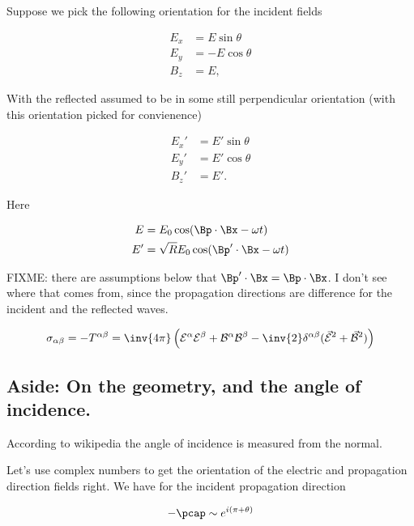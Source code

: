 Suppose we pick the following orientation for the incident fields

\begin{align}\label{eqn:relativisticElectrodynamicsT9:70}
E_x &= E \sin\theta \\
E_y &= -E \cos\theta \\
B_z &= E ,
\end{align}

With the reflected assumed to be in some still perpendicular orientation (with this orientation picked for convienence)

\begin{align}\label{eqn:relativisticElectrodynamicsT9:90}
E_x' &= E' \sin\theta \\
E_y' &= E' \cos\theta \\
B_z' &= E'.
\end{align}

Here

\begin{align}\label{eqn:relativisticElectrodynamicsT9:110}
E &= E_0 \cos(\Bp \cdot \Bx - \omega t) \\
E' &= \sqrt{R} E_0 \cos(\Bp' \cdot \Bx - \omega t)
\end{align}

FIXME: there are assumptions below that $\Bp' \cdot \Bx = \Bp \cdot \Bx$.  I don't see where that comes from, since the propagation directions are difference for the incident and the reflected waves.

\begin{equation}\label{eqn:relativisticElectrodynamicsT9:130}
\sigma_{\alpha\beta} = -T^{\alpha\beta} = \inv{4\pi} \left(
\mathcal{E}^\alpha
\mathcal{E}^\beta
+\mathcal{B}^\alpha
\mathcal{B}^\beta
- \inv{2} \delta^{\alpha\beta} ( \vec{\mathcal{E}}^2 + \vec{\mathcal{B}}^2 )
\right)
\end{equation}

\subsection{Aside: On the geometry, and the angle of incidence.}

According to wikipedia \cite{wiki:angleOfIncidence} the angle of incidence is measured from the normal.

Let's use complex numbers to get the orientation of the electric and propagation direction fields right.  We have for the incident propagation direction

\begin{equation}\label{eqn:relativisticElectrodynamicsT9:520}
-\pcap \sim e^{i (\pi + \theta) }
\end{equation}

